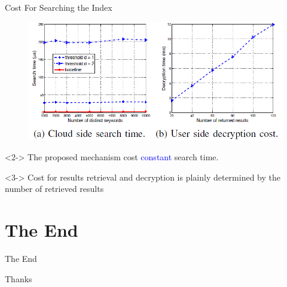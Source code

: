 \documentclass[handout]{beamer}
\begin{document}
\begin{frame}{Cost For Searching the Index}
	\begin{figure}
		\includegraphics[width=.75\textwidth]{subfig4.jpg}
	\end{figure}
	\begin{block}<2->{}
		The proposed  mechanism cost \textcolor{blue}{constant} search time.
	\end{block}
	\begin{exampleblock}<3->{}
		Cost for results retrieval and decryption is plainly determined by the \textcolor[rgb]{0.1,0.7,0.2}{number} of retrieved results
	\end{exampleblock}
\end{frame}


\section{The End}
\begin{frame}{The End}
\Huge{\centerline{Thanks}}
\end{frame}

\end{document}
